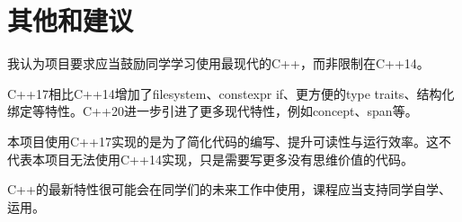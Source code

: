 \documentclass[a4paper,UTF8]{ctexart}
\begin{document}
\section{其他和建议}
我认为项目要求应当鼓励同学学习使用最现代的C++，而非限制在C++14。
\par
C++17相比C++14增加了filesystem、constexpr if、更方便的type traits、结构化绑定等特性。C++20进一步引进了更多现代特性，例如concept、span等。
\par
本项目使用C++17实现的是为了简化代码的编写、提升可读性与运行效率。这不代表本项目无法使用C++14实现，只是需要写更多没有思维价值的代码。
\par
C++的最新特性很可能会在同学们的未来工作中使用，课程应当支持同学自学、运用。




\end{document}
